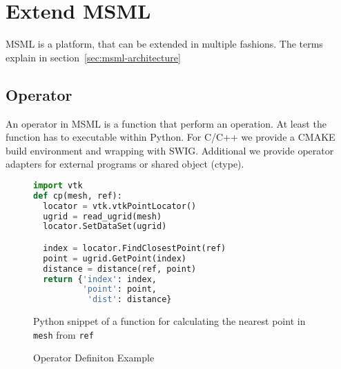 \section{Extend MSML}
\label{sec:extend}

MSML is a platform, that can be extended in multiple fashions.
The terms explain in section~\ref{sec:msml-architecture}

\subsection{Operator}
\label{sec:operator}

An operator in MSML is a function that perform an operation. At least
the function has to executable within Python. For C/C++ we provide a
CMAKE build environment and wrapping with SWIG. Additional we provide
operator adapters for external programs or shared object (ctype).

\begin{figure}
  \centering
\begin{lstlisting}[language=Python]
import vtk
def cp(mesh, ref):
  locator = vtk.vtkPointLocator()
  ugrid = read_ugrid(mesh)
  locator.SetDataSet(ugrid)

  index = locator.FindClosestPoint(ref)
  point = ugrid.GetPoint(index)
  distance = distance(ref, point)
  return {'index': index,
          'point': point,
           'dist': distance}
\end{lstlisting}
  \caption{Python snippet of a function for calculating the nearest
    point in \texttt{mesh} from \texttt{ref}}
  \label{fig:get_points}
\end{figure}

\begin{figure*}[h]
  \centering
  
  \caption{Operator Definiton Example}
  \label{fig:operatorxml}
\end{figure*}


